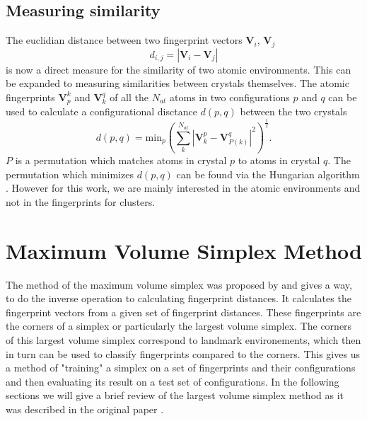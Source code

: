 \subsection{Measuring similarity}
The euclidian distance between two fingerprint vectors $\mathbf{V}_i$, $\mathbf{V}_j$ 
\begin{equation}\label{fp_dist}
d_{i,j}=|\mathbf{V}_i-\mathbf{V}_j|
\end{equation}
is now a direct measure for the similarity of two atomic environments. This can be expanded to measuring similarities between crystals themselves. The atomic fingerprints $\mathbf{V}_p^k$ and $\mathbf{V}_k^q$ of all the $N_{at}$ atoms in two configurations $p$ and $q$ can be used to calculate a configurational disctance $d(p,q)$ between the two crystals \cite{Zhu2016}
\begin{equation}d(p,q)=\text{min}_p\left(\sum_k^{N_{at}}|\mathbf{V}^p_k-\mathbf{V}^q_{P(k)}|^2\right)^{\frac{1}{2}}.\end{equation}
$P$ is a permutation which matches atoms in crystal $p$ to atoms in crystal $q$. The permutation which minimizes $d(p,q)$ can be found via the Hungarian algorithm \cite{Kuhn1955}. However for this work, we are mainly interested in the atomic environments and not in the fingerprints for clusters.

\section{Maximum Volume Simplex Method}
The method of the maximum volume simplex was proposed by \citeauthor{Behnam2020} \cite{Behnam2020} and gives a way, to do the inverse operation to calculating fingerprint distances. It calculates the fingerprint vectors from a given set of fingerprint distances. These fingerprints are the corners of a simplex or particularly the largest volume simplex. The corners of this largest volume simplex correspond to landmark environements, which then in turn can be used to classify fingerprints compared to the corners. This gives us a method of "training" a simplex on a set of fingerprints and their configurations and then evaluating its result on a test set of configurations. In the following sections we will give a brief review of the largest volume simplex method as it was described in the original paper \cite{Behnam2020}.
